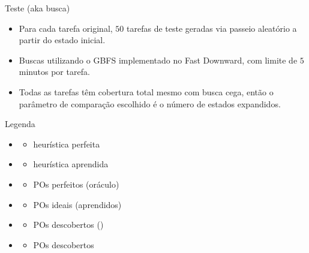 \documentclass{beamer}
\begin{document}
\begin{frame}{Teste (aka busca)}
\begin{itemize}
  \item Para cada tarefa original, \alert{$50$ tarefas de teste} geradas via passeio aleatório a partir do estado inicial.
  \pause
  \item Buscas utilizando o GBFS implementado no Fast Downward, com limite de \alert{$5$ minutos} por tarefa.
  \pause
  \item Todas as tarefas têm cobertura total mesmo com busca cega, então o parâmetro de comparação escolhido é o \alert{número de estados expandidos}.
\end{itemize}
\end{frame}

\begin{frame}{Legenda}
\begin{multicols}{2}
\begin{itemize}
  \item \hstar
    \begin{itemize}
      \item heurística perfeita
    \end{itemize}
  \item \hnn
    \begin{itemize}
      \item heurística aprendida
    \end{itemize}
  \item \postartable
    \begin{itemize}
      \item POs perfeitos (oráculo)
    \end{itemize}
  \item \postar
    \begin{itemize}
      \item POs ideais (aprendidos)
    \end{itemize}
  \item \pogstar
    \begin{itemize}
      \item POs descobertos (\hstar)
    \end{itemize}
  \item \alert{\pog}
    \begin{itemize}
      \item POs descobertos
    \end{itemize}

\end{itemize}
\end{multicols}
\end{frame}
\end{document}
